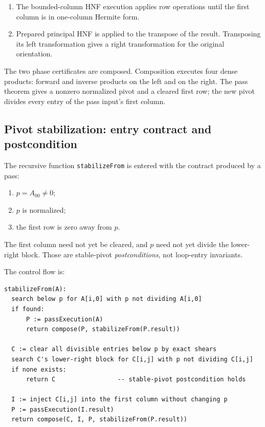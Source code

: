 \documentclass[11pt]{article}
\theoremstyle{definition}
\newcommand{\decl}[1]{\nolinkurl{#1}}
\begin{document}
\begin{enumerate}
  \item The bounded-column HNF execution applies row operations until the first column is in one-column Hermite form.
  \item Prepared principal HNF is applied to the transpose of the result.  Transposing its left transformation gives a right transformation for the original orientation.
\end{enumerate}

The two phase certificates are composed.  Composition executes four dense products: forward and inverse products on the left and on the right.  The pass theorem gives a nonzero normalized pivot and a cleared first row; the new pivot divides every entry of the pass input's first column.

\subsection{Pivot stabilization: entry contract and postcondition}
\label{sec:stabilize}

The recursive function \decl{stabilizeFrom} is entered with the contract produced by a pass:
\begin{enumerate}
  \item $p=A_{00}\ne0$;
  \item $p$ is normalized;
  \item the first row is zero away from $p$.
\end{enumerate}
The first column need not yet be cleared, and $p$ need not yet divide the lower-right block.  Those are stable-pivot \emph{postconditions}, not loop-entry invariants.

The control flow is:

\begin{center}
\begin{minipage}{0.94\linewidth}
\begin{lstlisting}[language={},basicstyle=\ttfamily\small]
stabilizeFrom(A):
  search below p for A[i,0] with p not dividing A[i,0]
  if found:
      P := passExecution(A)
      return compose(P, stabilizeFrom(P.result))

  C := clear all divisible entries below p by exact shears
  search C's lower-right block for C[i,j] with p not dividing C[i,j]
  if none exists:
      return C                 -- stable-pivot postcondition holds

  I := inject C[i,j] into the first column without changing p
  P := passExecution(I.result)
  return compose(C, I, P, stabilizeFrom(P.result))
\end{lstlisting}
\end{minipage}
\end{center}
\end{document}
